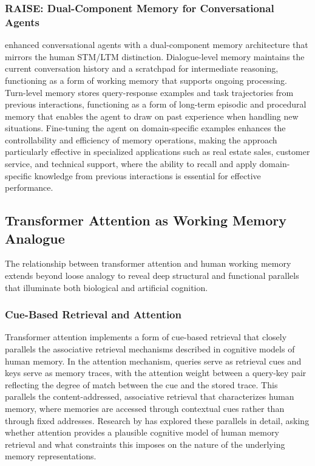 \subsubsection{RAISE: Dual-Component Memory for Conversational Agents}

\citet{liu2024raise} enhanced conversational agents with a dual-component memory architecture that mirrors the human STM/LTM distinction. Dialogue-level memory maintains the current conversation history and a scratchpad for intermediate reasoning, functioning as a form of working memory that supports ongoing processing. Turn-level memory stores query-response examples and task trajectories from previous interactions, functioning as a form of long-term episodic and procedural memory that enables the agent to draw on past experience when handling new situations. Fine-tuning the agent on domain-specific examples enhances the controllability and efficiency of memory operations, making the approach particularly effective in specialized applications such as real estate sales, customer service, and technical support, where the ability to recall and apply domain-specific knowledge from previous interactions is essential for effective performance.

\subsection{Transformer Attention as Working Memory Analogue}

The relationship between transformer attention and human working memory extends beyond loose analogy to reveal deep structural and functional parallels that illuminate both biological and artificial cognition.

\subsubsection{Cue-Based Retrieval and Attention}

Transformer attention implements a form of cue-based retrieval that closely parallels the associative retrieval mechanisms described in cognitive models of human memory. In the attention mechanism, queries serve as retrieval cues and keys serve as memory traces, with the attention weight between a query-key pair reflecting the degree of match between the cue and the stored trace. This parallels the content-addressed, associative retrieval that characterizes human memory, where memories are accessed through contextual cues rather than through fixed addresses. Research by \citet{ryskin2025attention} has explored these parallels in detail, asking whether attention provides a plausible cognitive model of human memory retrieval and what constraints this imposes on the nature of the underlying memory representations.

